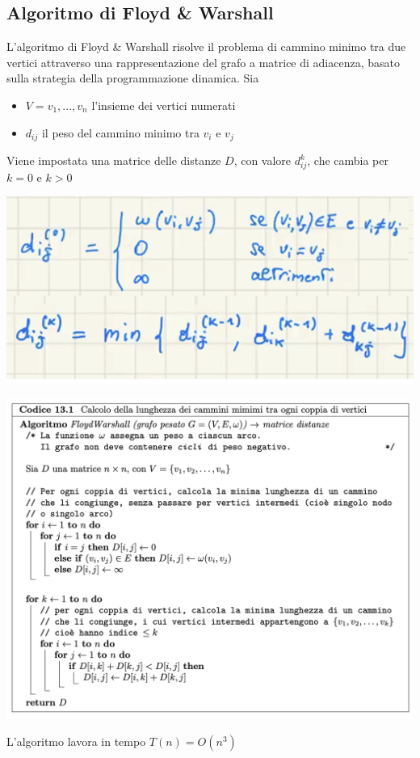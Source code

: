 \documentclass[11pt, oneside]{article}   	%
\begin{document}
\subsection*{Algoritmo di Floyd \& Warshall}
L'algoritmo di Floyd \& Warshall risolve il problema di cammino minimo tra due vertici attraverso una rappresentazione del grafo a matrice di adiacenza, basato sulla strategia della programmazione dinamica. Sia\begin{itemize}
\item $V = {v_1, ..., v_n}$ l'insieme dei vertici numerati
\item $d_{ij}$ il peso del cammino minimo tra $v_i$ e $v_j$
\end{itemize}
Viene impostata una matrice delle distanze $D$, con valore $d^{k}_{ij}$, che cambia per $k=0$ e $k > 0$
\begin{center}
\includegraphics[scale=0.5]{floyd2}
\end{center}\begin{center}
\includegraphics[scale=0.5]{floyd}
\end{center}
L'algoritmo lavora in tempo $T(n) = O(n^3)$
\end{document}
